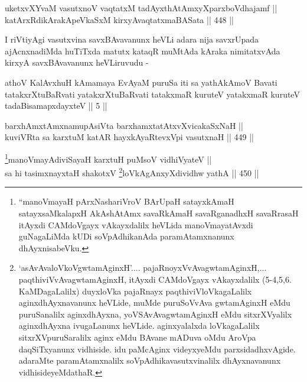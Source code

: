 
\begin{shl}
uketxvXYvaM vasutxnoV vaqtatxM tadAyxthAtAmxyXparxboVdhajamf || \\
katArxRdikArakApeVkaSxM kirxyAvaqtatxmaBASata \hfill || 448 ||  
\end{shl}

\begin{artha}
I riVtiyAgi vasutxvina savxBAvavanunx heVLi adara nija savxrUpada
ajAcnxnadiMda huTiTxda matutx kataqR muMtAda kAraka nimitatxvAda
kirxyA savxBAvavanunx heVLiruvudu -
\end{artha}


\begin{kandikeshl}
athoV KalAvxhuH kAmamaya EvAyaM puruSa iti sa yathAkAmoV Bavati tatakxrXtuBaRvati yatakxrXtuBaRvati tatakxmaR kuruteV yatakxmaR kuruteV tadaBisamapxdayxteV || 5 ||
\end{kandikeshl}

\begin{shl}
barxhAmxtAmxnamupAsiVta barxhamxtatAtxvXvicakaSxNaH ||  \\
kuviVRta sa karxtuM katAR hayxkAyaRtevxV\s pi vasutxnaH \hfill || 449 ||  
\end{shl}

\begin{shl}
\footnote{``manoVmayaH pArxNashariVroV BArUpaH satayxkAmaH satayxsaMkalapxH AkAshAtAmx savaRkAmaH savaRganadhxH savaRrasaH itAyxdi CAMdoVgayx vAkayxdalilx heVLida manoVmayatAvxdi guNagaLiMda kUDi soVpAdhikanAda paramAtamxnanunx dhAyxnisabeVku.}manoVmayAdiviSayaH karxtuH puMsoV vidhiVyateV || \\ 
sa hi tasimxnayxtaH shakotxV \footnote{`asAvAvaloVkoVgwtamAginxH'.... pajaRnoyxVvAvagwtamAginxH,... paqthiviVvAva\break gwtamAginxH, itAyxdi CAMdoVgayx vAkayxdalilx (5-4,5,6. KaMDagaLalilx) duyxloVka pajaRnayx paqthiviVloVkagaLalilx aginxdhAyxnavanunx heVLide, muMde puruSoVvAva gwtamAginxH eMdu puruSanalilx aginxdhAyxna, yoVSAvAvagwtamAginxH eMdu sitxrXVyalilx aginxdhAyxna ivugaLanunx heVLide. aginxyalalxda loVkagaLalilx sitxrXVpuruSaralilx aginx eMdu BAvane mADuva oMdu AroVpa daqSiTxyanunx vidhiside. idu paMcAginx videyxyeMdu parxsidadhxvAgide. adaraMte paramAtamxnalilx soVpAdhikavasutxvinalilx dhAyxnavanunx vidhisideyeMdathaR.}loVkAgAnxyXdividhw yathA \hfill || 450 || 
\end{shl}



